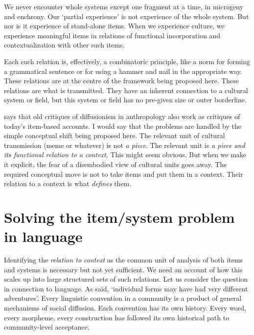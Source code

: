 We never encounter whole systems except one fragment at a time, in microgeny and enchrony. Our 
\textquoteleft partial experience' \citep[191]{le_page_acts_1985} is not 
experience of the whole system. But nor is it experience of stand-alone 
items. When we experience culture, we experience meaningful items in 
relations of functional incorporation and contextualization with other 
such items. 


Each such relation is, effectively, a combinatoric principle, like a 
norm for forming a grammatical sentence or for using a hammer and nail 
in the appropriate way. These relations are at the centre of the 
framework being proposed here. These relations are what is transmitted. 
They have an inherent connection to a cultural system or field, 
but this system or field has no pre-given size or outer borderline.



\citet{bloch_well-disposed_2000} says that old critiques of diffusionism in anthropology 
also work as critiques of today's item-based accounts. I would say that 
the problems are handled by the simple conceptual shift 
being proposed here. The relevant unit of cultural transmission (meme or 
whatever) is not \textit{a piece}. The relevant unit is \textit{a piece and its 
functional relation to a context}. This might seem obvious. But when we 
make it explicit, the fear of a disembodied view of cultural units goes 
away. The required conceptual move is not to take 
items and put them in a context. Their relation to a context is what \textit{defines} them. 



\section{Solving the item/system problem in language}


Identifying the \textit{relation to context} as the common unit of 
analysis of both items and systems is necessary but not yet sufficient. We 
need an account of how this scales up into large structured sets of such 
relations. Let us consider the question in connection to language. As \citet[444]{bloomfield_language_1933} said, \textquoteleft individual forms may have had very 
different adventures'. Every linguistic convention in a community is a 
product of general mechanisms of social diffusion. Each convention has its own history. Every word, 
every morpheme, every construction has followed its own historical path to 
community-level acceptance. 



